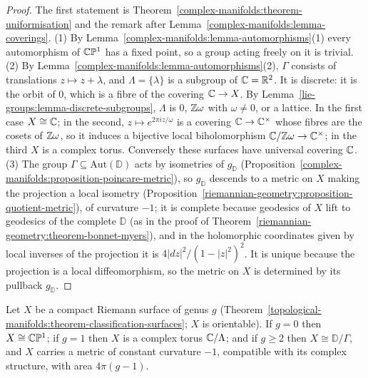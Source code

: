 \begin{proof}
The first statement is Theorem~\ref{complex-manifolds:theorem-uniformisation} and the remark after Lemma~\ref{complex-manifolds:lemma-coverings}. (1) By
Lemma~\ref{complex-manifolds:lemma-automorphisms}(1) every automorphism of $\mathbb{C}\mathbb{P}^1$ has a fixed point, so a group acting freely on it is trivial. (2) By
Lemma~\ref{complex-manifolds:lemma-automorphisms}(2), $\Gamma$ consists of translations $z \mapsto z + \lambda$, and $\Lambda = \{\lambda\}$ is a subgroup of $\mathbb{C} = \mathbb{R}^2$. It is
discrete: it is the orbit of $0$, which is a fibre of the covering $\mathbb{C} \to X$. By Lemma~\ref{lie-groups:lemma-discrete-subgroups}, $\Lambda$ is $0$, $\mathbb{Z}\omega$ with
$\omega \neq 0$, or a lattice. In the first case $X \cong \mathbb{C}$; in the second, $z \mapsto e^{2\pi iz/\omega}$ is a covering $\mathbb{C} \to \mathbb{C}^\times$ whose fibres are the cosets of
$\mathbb{Z}\omega$, so it induces a bijective local biholomorphism $\mathbb{C}/\mathbb{Z}\omega \to \mathbb{C}^\times$; in the third $X$ is a complex torus. Conversely these surfaces have universal covering
$\mathbb{C}$. (3) The group $\Gamma \subseteq \mathrm{Aut}(\mathbb{D})$ acts by isometries of $g_{\mathbb{D}}$ (Proposition~\ref{complex-manifolds:proposition-poincare-metric}), so
$g_{\mathbb{D}}$ descends to a metric on $X$ making the projection a local isometry (Proposition~\ref{riemannian-geometry:proposition-quotient-metric}), of curvature $-1$; it is
complete because geodesics of $X$ lift to geodesics of the complete $\mathbb{D}$ (as in the proof of Theorem~\ref{riemannian-geometry:theorem-bonnet-myers}), and in the
holomorphic coordinates given by local inverses of the projection it is $4|dz|^2/(1 - |z|^2)^2$. It is unique because the projection is a local diffeomorphism, so the metric on
$X$ is determined by its pullback $g_{\mathbb{D}}$.
\end{proof}

\begin{corollary}\label{complex-manifolds:corollary-compact-uniformisation}
Let $X$ be a compact Riemann surface of genus $g$ (Theorem~\ref{topological-manifolds:theorem-classification-surfaces}; $X$ is orientable). If $g = 0$ then $X \cong \mathbb{C}\mathbb{P}^1$; if
$g = 1$ then $X$ is a complex torus $\mathbb{C}/\Lambda$; and if $g \geq 2$ then $X \cong \mathbb{D}/\Gamma$, and $X$ carries a metric of constant curvature $-1$, compatible with its
complex structure, with area $4\pi(g - 1)$.
\end{corollary}

